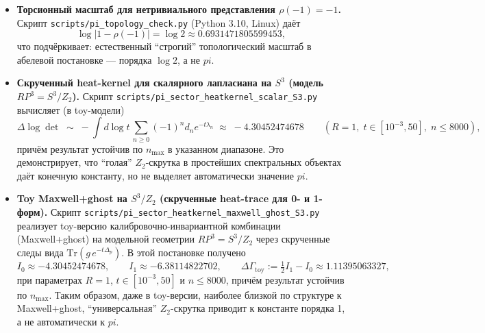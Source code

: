 \documentclass[12pt]{article}
\def\mathbb#1{#1}%
\def\pi{pi}%
\begin{document}
\begin{itemize}
  \item \textbf{Торсионный масштаб для нетривиального представления $\rho(-1)=-1$.}
  Скрипт \texttt{scripts/pi\_topology\_check.py} (Python 3.10, Linux) даёт
  \begin{equation}
    \log|1-\rho(-1)|=\log 2\approx 0.6931471805599453,
  \end{equation}
  что подчёркивает: естественный ``строгий'' топологический масштаб в абелевой постановке --- порядка $\log 2$, а не $\pi$.

  \item \textbf{Скрученный heat-kernel для скалярного лапласиана на $S^3$ (модель $\mathbb{RP}^3=S^3/\mathbb{Z}_2$).}
  Скрипт \texttt{scripts/pi\_sector\_heatkernel\_scalar\_S3.py} вычисляет (в toy-модели)
  \begin{equation}
    \Delta\log\det\;\sim\;-
    \int d\log t\,\sum_{n\ge 0}(-1)^n d_n e^{-t\lambda_n}
    \;\approx\;-4.30452474678
    \qquad (R=1,\;t\in[10^{-3},50],\;n\le 8000),
  \end{equation}
  причём результат устойчив по $n_{\max}$ в указанном диапазоне.
  Это демонстрирует, что ``голая'' $\mathbb{Z}_2$-скрутка в простейших спектральных объектах даёт конечную константу, но не выделяет автоматически значение $\pi$.

  \item \textbf{Toy Maxwell+ghost на $S^3/\mathbb{Z}_2$ (скрученные heat-trace для 0- и 1-форм).}
  Скрипт \texttt{scripts/pi\_sector\_heatkernel\_maxwell\_ghost\_S3.py} реализует toy-версию калибровочно-инвариантной комбинации (Maxwell+ghost) на модельной геометрии $\mathbb{RP}^3=S^3/\mathbb{Z}_2$ через скрученные следы вида $\mathrm{Tr}(g\,e^{-t\Delta_p})$.
  В этой постановке получено
  \begin{equation}
    I_0\approx -4.30452474678,
    \qquad
    I_1\approx -6.38114822702,
    \qquad
    \Delta\Gamma_{\mathrm{toy}}:=\tfrac12 I_1-I_0\approx 1.11395063327,
  \end{equation}
  при параметрах $R=1$, $t\in[10^{-3},50]$ и $n\le 8000$, причём результат устойчив по $n_{\max}$.
  Таким образом, даже в toy-версии, наиболее близкой по структуре к Maxwell+ghost, ``универсальная'' $\mathbb{Z}_2$-скрутка приводит к константе порядка 1, а не автоматически к $\pi$.


\end{itemize}
\end{document}
